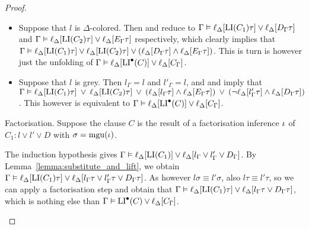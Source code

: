\begin{proof}
\begin{description}
\begin{itemize}
				\item Suppose that $l$ is $\Delta$-colored.
					Then \markA{} and \markB{} reduce to 
					$\Gamma \vDash \ell_{\Delta}[\operatorname{LI}(C_1)\tau] \lor \ell_{\Delta}[D_\Gamma\tau]$
					and
					$\Gamma \vDash \ell_{\Delta}[\operatorname{LI}(C_2)\tau] \lor \ell_{\Delta}[E_\Gamma\tau]$
					respectively,
					which clearly implies that 
					$\Gamma \vDash \ell_{\Delta}[\operatorname{LI}(C_1)\tau] \lor \ell_{\Delta}[\operatorname{LI}(C_2)\tau] \lor (\ell_{\Delta}[D_\Gamma\tau] \land \ell_{\Delta}[E_\Gamma\tau])$.
					This is turn is however just the unfolding of
					$\Gamma \vDash \ell_{\Delta}[\operatorname{LI}^\bullet(C)] \lor \ell_{\Delta}[C_\Gamma]$.

				\item Suppose that $l$ is grey.
					Then $l_\Gamma = l$ and $l'_\Gamma = l$, and 
					\markA{} and \markB{} imply that
					$\Gamma \vDash
					\ell_{\Delta}[\operatorname{LI}(C_1)\tau] \;\,{\lor}\;\,
					\ell_{\Delta}[\operatorname{LI}(C_2)\tau] \;\,{\lor}\;\,\allowbreak
					(\ell_{\Delta}[l_\Gamma\tau] \land \ell_{\Delta}[E_\Gamma\tau]) \;\,{\lor}\;\,\allowbreak
					(\lnot\ell_{\Delta}[l'_\Gamma\tau] \land \ell_{\Delta}[D_\Gamma\tau])$.
					This however is equivalent to
					$\Gamma \vDash \ell_{\Delta}[\operatorname{LI}^\bullet(C)] \lor \ell_{\Delta}[C_\Gamma]$.

			\end{itemize}




		\item{} Factorisation. 
			Suppose the clause $C$ is the result of a factorisation inference $\iota$ of $C_1: l \lor l' \lor D$ with $\sigma=\operatorname{mgu}(\iota)$.

			The induction hypothesis gives $\Gamma \vDash \ell_{\Delta}[ \operatorname{LI}(C_1) ] \lor \ell_{\Delta}[ l_\Gamma \lor l'_\Gamma \lor D_\Gamma ]$.
			By Lemma~\ref{lemma:substitute_and_lift}, we obtain
			$\Gamma \vDash \ell_{\Delta}[ \operatorname{LI}(C_1)\tau ] \lor \ell_{\Delta}[ l_\Gamma\tau \lor l'_\Gamma\tau \lor D_\Gamma\tau ]$.
			As however $l\sigma \equiv l'\sigma$, 
			also $l\tau \equiv l'\tau$, so we can apply a factorisation step and obtain that
			$\Gamma \vDash \ell_{\Delta}[ \operatorname{LI}(C_1)\tau ] \lor \ell_{\Delta}[ l_\Gamma\tau \lor D_\Gamma\tau ]$,
			which is nothing else than $\Gamma \vDash \operatorname{LI}^\bullet(C) \lor \ell_{\Delta}[C_\Gamma]$.


\end{description}
\end{proof}
